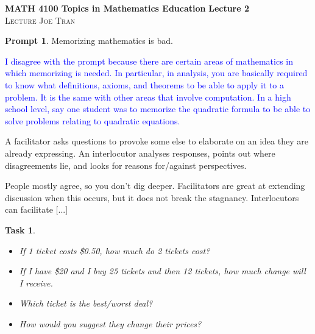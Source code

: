 \documentclass[11pt]{article}
\theoremstyle{theorem}\newtheorem*{task}{Task}
\theoremstyle{theorem}\newtheorem*{example}{Example}
\theoremstyle{definition}\newtheorem*{solution}{Solution}
\theoremstyle{theorem}\newtheorem*{prompt}{Prompt}
\begin{document}
\noindent \textbf{MATH 4100 Topics in Mathematics Education} \hfill \textbf{Lecture 2} \\
\textsc{Lecture} \hfill \textsc{Joe Tran}

\begin{prompt}
    Memorizing mathematics is bad.
\end{prompt}

\textcolor{blue}{I disagree with the prompt because there are certain areas of mathematics in which memorizing is needed. In particular, in analysis, you are basically required to know what definitions, axioms, and theorems to be able to apply it to a problem. It is the same with other areas that involve computation. In a high school level, say one student was to memorize the quadratic formula to be able to solve problems relating to quadratic equations.}

A facilitator asks questions to provoke some else to elaborate on an idea they are already expressing. An interlocutor analyses responses, points out where disagreements lie, and looks for reasons for/against perspectives.

People mostly agree, so you don't dig deeper. Facilitators are great at extending discussion when this occurs, but it does not break the stagnancy. Interlocutors can facilitate [...]

\begin{task}
    \begin{itemize}
        \item[(a)] If 1 ticket costs \$0.50, how much do 2 tickets cost?
        \item[(b)] If I have \$20 and I buy 25 tickets and then 12 tickets, how much change will I receive.
        \item[(c)] Which ticket is the best/worst deal?
        \item[(d)] How would you suggest they change their prices?
    \end{itemize}
    \textcolor{red}{\begin{center}
    \end{center}}
\end{task}
\end{document}
